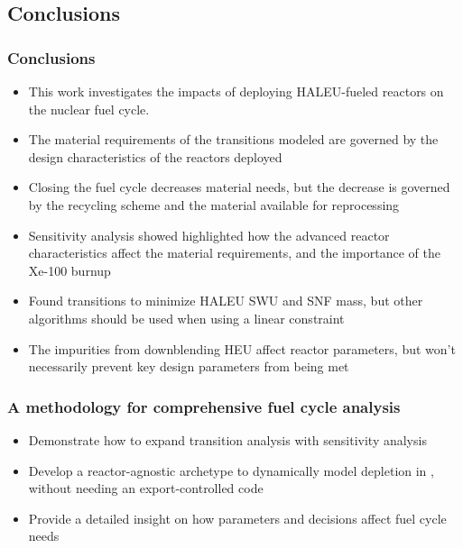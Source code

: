 \subsection{Conclusions}
\begin{frame}
      \frametitle{Conclusions}
      \begin{itemize}
        \item This work investigates the impacts of deploying \gls{HALEU}-fueled 
              reactors on the nuclear fuel cycle.
        \item<2-> The material requirements of the transitions modeled are governed 
              by the design characteristics of the reactors deployed
        \item<2-> Closing the fuel cycle decreases material needs, but the 
              decrease is governed by the recycling scheme and the 
              material available for reprocessing
        \item<3-> Sensitivity analysis showed highlighted how the 
              advanced reactor characteristics affect the material requirements, and 
              the importance of the Xe-100 burnup
        \item<3-> Found transitions to minimize \gls{HALEU} \gls{SWU} 
              and \gls{SNF} mass, but other algorithms should 
              be used when using a linear constraint
        \item<4-> The impurities from downblending \gls{HEU} affect 
              reactor parameters, but won't necessarily prevent key design 
              parameters from being met
      \end{itemize}
\end{frame}

\begin{frame}
      \frametitle{A methodology for comprehensive fuel cycle analysis}
      \begin{itemize}
            \item Demonstrate how to expand transition analysis with 
                  sensitivity analysis
            \item Develop a reactor-agnostic archetype to dynamically model depletion 
                  in \Cyclus, without needing an export-controlled code
            \item<2-> Provide a detailed insight on how parameters and 
                  decisions affect fuel cycle needs
      \end{itemize}
\end{frame}


